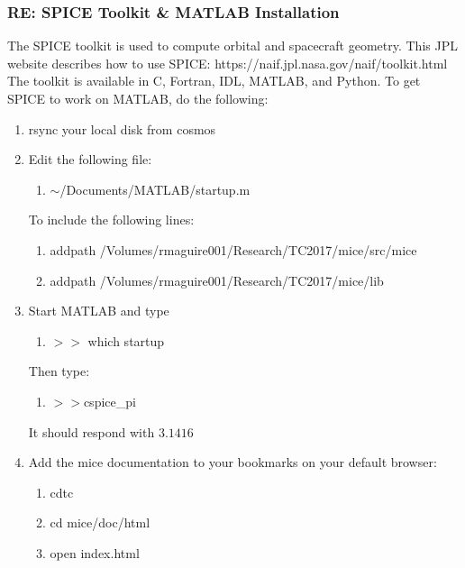 \documentclass[crop=false,class=book]{standalone}
\begin{document}
\subsubsection{\footnotesize RE: SPICE Toolkit \& MATLAB Installation}
The SPICE toolkit is used to compute orbital and spacecraft geometry. This JPL website describes how to use SPICE: https://naif.jpl.nasa.gov/naif/toolkit.html
The toolkit is available in C, Fortran, IDL, MATLAB, and Python. To get SPICE to work on MATLAB, do the following:
\begin{enumerate}
    \item rsync your local disk from cosmos
    \item Edit the following file:
    \begin{enumerate}
        \item[] $\sim$/Documents/MATLAB/startup.m
    \end{enumerate}
    To include the following lines:
    \begin{enumerate}
        \item[] addpath /Volumes/rmaguire001/Research/TC2017/mice/src/mice
        \item[] addpath /Volumes/rmaguire001/Research/TC2017/mice/lib
    \end{enumerate}
    \item Start MATLAB and type
    \begin{enumerate}
        \item[] $>>$ which startup
    \end{enumerate}
    Then type:
\begin{enumerate}
    \item[] $>>$cspice\_pi
\end{enumerate}
    It should respond with $3.1416$
    \item Add the mice documentation to your bookmarks on your default browser:
    \begin{enumerate}
        \item[] cdtc
        \item[] cd mice/doc/html
        \item[] open index.html
    \end{enumerate}
\end{enumerate}
\end{document}
